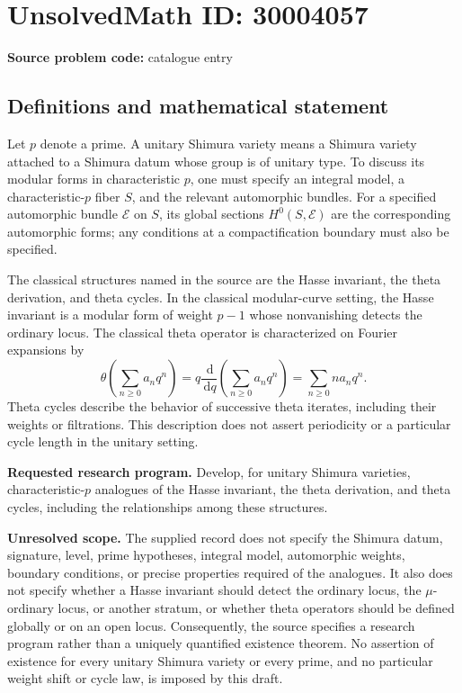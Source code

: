 \documentclass[11pt]{article}
\newcommand{\dd}{\,\mathrm{d}}
\begin{document}
\section*{UnsolvedMath ID: 30004057}
\textbf{Source problem code:} catalogue entry
\subsection{Definitions and mathematical statement}
Let \(p\) denote a prime. A unitary Shimura variety means a Shimura variety attached to a Shimura datum whose group is of unitary type. To discuss its modular forms in characteristic \(p\), one must specify an integral model, a characteristic-\(p\) fiber \(S\), and the relevant automorphic bundles. For a specified automorphic bundle \(\mathcal E\) on \(S\), its global sections \(H^0(S,\mathcal E)\) are the corresponding automorphic forms; any conditions at a compactification boundary must also be specified.

The classical structures named in the source are the Hasse invariant, the theta derivation, and theta cycles. In the classical modular-curve setting, the Hasse invariant is a modular form of weight \(p-1\) whose nonvanishing detects the ordinary locus. The classical theta operator is characterized on Fourier expansions by
\[
\theta\!\left(\sum_{n\geq 0}a_nq^n\right)
=q\frac{\dd}{\dd q}\left(\sum_{n\geq 0}a_nq^n\right)
=\sum_{n\geq 0}n a_nq^n.
\]
Theta cycles describe the behavior of successive theta iterates, including their weights or filtrations. This description does not assert periodicity or a particular cycle length in the unitary setting.

\textbf{Requested research program.} Develop, for unitary Shimura varieties, characteristic-\(p\) analogues of the Hasse invariant, the theta derivation, and theta cycles, including the relationships among these structures.

\textbf{Unresolved scope.} The supplied record does not specify the Shimura datum, signature, level, prime hypotheses, integral model, automorphic weights, boundary conditions, or precise properties required of the analogues. It also does not specify whether a Hasse invariant should detect the ordinary locus, the \(\mu\)-ordinary locus, or another stratum, or whether theta operators should be defined globally or on an open locus. Consequently, the source specifies a research program rather than a uniquely quantified existence theorem. No assertion of existence for every unitary Shimura variety or every prime, and no particular weight shift or cycle law, is imposed by this draft.
\end{document}
